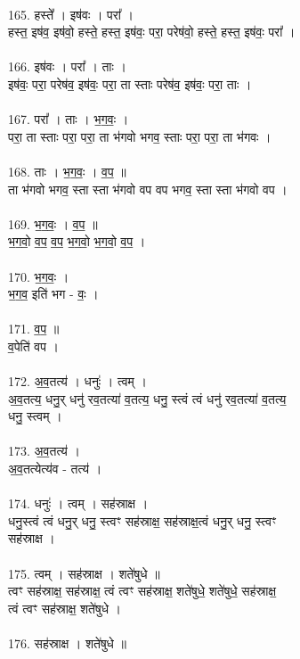 \\
165. हस्ते᳚ । इष॑वः । परा᳚ ।\\
हस्त॒ इष॑व॒ इष॑वो॒ हस्ते॒ हस्त॒ इष॑वः॒ परा॒ परेष॑वो॒ हस्ते॒ हस्त॒ इष॑वः॒ परा᳚ ।\\
\\
166. इष॑वः । परा᳚ । ताः ।\\
इष॑वः॒ परा॒ परेष॑व॒ इष॑वः॒ परा॒ ता स्ताः परेष॑व॒ इष॑वः॒ परा॒ ताः ।\\
\\
167. परा᳚ । ताः । भ॒ग॒वः॒ ।\\
परा॒ ता स्ताः परा॒ परा॒ ता भ॑गवो भगव॒ स्ताः परा॒ परा॒ ता भ॑गवः ।\\
\\
168. ताः । भ॒ग॒वः॒ । व॒प॒ ॥\\
ता भ॑गवो भगव॒ स्ता स्ता भ॑गवो वप वप भगव॒ स्ता स्ता भ॑गवो वप ।\\
\\
169. भ॒ग॒वः॒ । व॒प॒ ॥\\
भ॒ग॒वो॒ व॒प॒ व॒प॒ भ॒ग॒वो॒ भ॒ग॒वो॒ व॒प॒ ।\\
\\
170. भ॒ग॒वः॒ ।\\
भ॒ग॒व॒ इति॑ भग - वः॒ ।\\
\\
171. व॒प॒ ॥\\
व॒पेति॑ वप ।\\
\\
172. अ॒व॒तत्य॑ । धनुः॑ । त्वम् ।\\
अ॒व॒तत्य॒ धनु॒र् धनु॑ रव॒तत्या॑ व॒तत्य॒ धनु॒ स्त्वं त्वं धनु॑ रव॒तत्या॑ व॒तत्य॒\\
धनु॒ स्त्वम् ।\\
\\
173. अ॒व॒तत्य॑ ।\\
अ॒व॒तत्येत्य॑व - तत्य॑ ।\\
\\
174. धनुः॑ । त्वम् । सह॑स्राक्ष ।\\
धनु॒स्त्वं त्वं धनु॒र् धनु॒ स्त्वꣳ सह॑स्राक्ष॒ सह॑स्राक्ष॒त्वं धनु॒र् धनु॒ स्त्वꣳ\\
सह॑स्राक्ष ।\\
\\
175. त्वम् । सह॑स्राक्ष । शते॑षुधे ॥\\
त्वꣳ सह॑स्राक्ष॒ सह॑स्राक्ष॒ त्वं त्वꣳ सह॑स्राक्ष॒ शते॑षुधे॒ शते॑षुधे॒ सह॑स्राक्ष॒\\
त्वं त्वꣳ सह॑स्राक्ष॒ शते॑षुधे ।\\
\\
176. सह॑स्राक्ष । शते॑षुधे ॥\\

